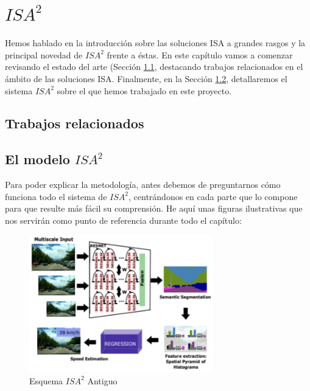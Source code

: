 \chapter{$ISA^{2}$}

Hemos hablado en la introducción sobre las soluciones \ac{ISA} a grandes rasgos y la principal novedad de $ISA^{2}$ frente a éstas. En este capítulo vamos a comenzar revisando el estado del arte (Sección \ref{sec:isa2_estado_del_arte}, destacando trabajos relacionados en el ámbito de las soluciones \ac{ISA}. Finalmente, en la Sección \ref{isa2_model}, detallaremos el sistema $ISA^{2}$ sobre el que hemos trabajado en este proyecto.


\section{Trabajos relacionados}
\label{sec:isa2_estado_del_arte}

\section{El modelo $ISA^{2}$}
\label{isa2_model}

Para poder explicar la metodología, antes debemos de preguntarnos cómo funciona todo el sistema de $ISA^{2}$, centrándonos en cada parte que lo compone para que resulte más fácil su comprensión. He aquí unas figuras ilustrativas que nos servirán como punto de referencia durante todo el capítulo:


\begin{figure}[H]
  \centering
  \includegraphics[width=8cm]{Figuras/Figura_Esquema_ISA2_Version_1_SegSem.eps}
  \caption{Esquema $ISA^{2}$ Antiguo}
  \label{fig:Isa_v1}
\end{figure}


